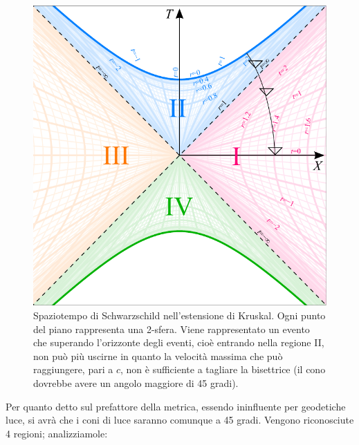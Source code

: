 \begin{figure}
    \centering
    \includegraphics[scale=0.8]{immagini/kruskal.pdf}
    \caption{Spaziotempo di Schwarzschild nell'estensione di Kruskal. Ogni punto del piano rappresenta una 2-sfera. Viene rappresentato un evento che superando l'orizzonte degli eventi, cioè entrando nella regione II, non può più uscirne in quanto la velocità massima che può raggiungere, pari a $c$, non è sufficiente a tagliare la bisettrice (il cono dovrebbe avere un angolo maggiore di 45 gradi).}
    \label{fig.kruskal}
\end{figure}
Per quanto detto sul prefattore della metrica, essendo ininfluente per geodetiche luce, si avrà che i coni di luce saranno comunque a 45 gradi.
Vengono riconosciute 4 regioni; analizziamole:
